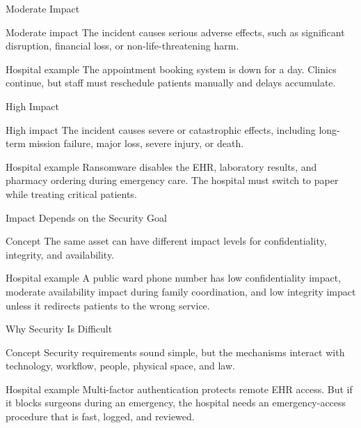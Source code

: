 \documentclass[presentation]{beamer}
\begin{document}
\begin{frame}[c]{Moderate Impact}
\begin{block}{Moderate impact}
The incident causes serious adverse effects, such as significant disruption, financial loss, or
non-life-threatening harm.
\end{block}

\begin{exampleblock}{Hospital example}
The appointment booking system is down for a day. Clinics continue, but staff must reschedule
patients manually and delays accumulate.
\end{exampleblock}
\end{frame}

\begin{frame}[c]{High Impact}
\begin{block}{High impact}
The incident causes severe or catastrophic effects, including long-term mission failure, major
loss, severe injury, or death.
\end{block}

\begin{exampleblock}{Hospital example}
Ransomware disables the EHR, laboratory results, and pharmacy ordering during emergency care.
The hospital must switch to paper while treating critical patients.
\end{exampleblock}
\end{frame}

\begin{frame}[c]{Impact Depends on the Security Goal}
\begin{block}{Concept}
The same asset can have different impact levels for confidentiality, integrity, and availability.
\end{block}

\begin{exampleblock}{Hospital example}
A public ward phone number has low confidentiality impact, moderate availability impact during
family coordination, and low integrity impact unless it redirects patients to the wrong service.
\end{exampleblock}
\end{frame}

\begin{frame}[c]{Why Security Is Difficult}
\begin{block}{Concept}
Security requirements sound simple, but the mechanisms interact with technology, workflow,
people, physical space, and law.
\end{block}

\begin{exampleblock}{Hospital example}
Multi-factor authentication protects remote EHR access. But if it blocks surgeons during an
emergency, the hospital needs an emergency-access procedure that is fast, logged, and reviewed.
\end{exampleblock}
\end{frame}
\end{document}
